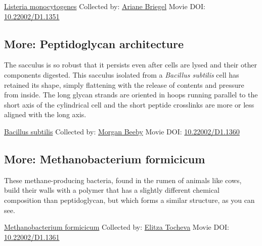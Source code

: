 \documentclass[]{tufte-book}
\begin{document}
\hypertarget{htmlwidget-7eace82b413abc8d7a2c}{}

\label{fig:2-2}\protect\hyperlink{tree}{Listeria monocytogenes} Collected by: \protect\hyperlink{ariane_briegel}{Ariane Briegel} Movie DOI: \href{https://doi.org/10.22002/D1.1351}{10.22002/D1.1351}

\hypertarget{Peptidoglycan_architecture}{%
\subsection*{More: Peptidoglycan architecture}\label{Peptidoglycan_architecture}}

The sacculus is so robust that it persists even after cells are lysed and their other components digested. This sacculus isolated from a \emph{Bacillus subtilis} cell has retained its shape, simply flattening with the release of contents and pressure from inside. The long glycan strands are oriented in hoops running parallel to the short axis of the cylindrical cell and the short peptide crosslinks are more or less aligned with the long axis.



\hypertarget{htmlwidget-347c068be8c53c20a190}{}

\label{fig:2-2a}\protect\hyperlink{tree}{Bacillus subtilis} Collected by: \protect\hyperlink{morgan_beeby}{Morgan Beeby} Movie DOI: \href{https://doi.org/10.22002/D1.1360}{10.22002/D1.1360}

\hypertarget{Methanobacterium_formicicum}{%
\subsection*{More: Methanobacterium formicicum}\label{Methanobacterium_formicicum}}

These methane-producing bacteria, found in the rumen of animals like cows, build their walls with a polymer that has a slightly different chemical composition than peptidoglycan, but which forms a similar structure, as you can see.



\hypertarget{htmlwidget-79c1ac3950b1acd52929}{}

\label{fig:2-2b}\protect\hyperlink{tree}{Methanobacterium formicicum} Collected by: \protect\hyperlink{elitza_tocheva}{Elitza Tocheva} Movie DOI: \href{https://doi.org/10.22002/D1.1361}{10.22002/D1.1361}
\end{document}

